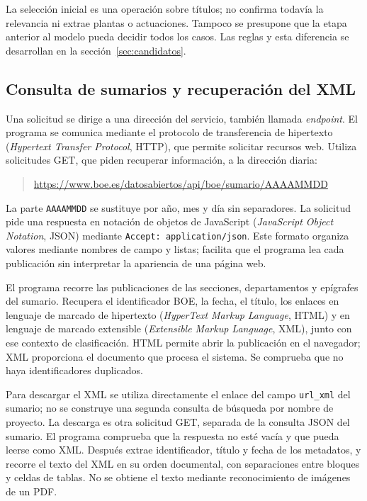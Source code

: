 La selección inicial es una operación sobre títulos; no confirma todavía la
relevancia ni extrae plantas o actuaciones. Tampoco se presupone que la etapa
anterior al modelo pueda decidir todos los casos. Las reglas y esta diferencia
se desarrollan en la sección~\ref{sec:candidatos}.

\subsection{Consulta de sumarios y recuperación del XML}
Una solicitud se dirige a una dirección del servicio, también llamada
\emph{endpoint}. El programa se comunica mediante el protocolo de transferencia
de hipertexto (\textit{Hypertext Transfer Protocol}, HTTP), que
permite solicitar recursos web. Utiliza solicitudes GET, que piden recuperar
información, a la dirección diaria:

\begin{quote}
\small
\url{https://www.boe.es/datosabiertos/api/boe/sumario/AAAAMMDD}
\end{quote}

La parte \texttt{AAAAMMDD} se sustituye por año, mes y día sin separadores.
La solicitud pide una respuesta en notación de objetos de JavaScript
(\textit{JavaScript Object Notation}, JSON) mediante
\texttt{Accept: application/json}. Este formato organiza
valores mediante nombres de campo y listas; facilita que el programa lea
cada publicación sin interpretar la apariencia de una página web.

El programa recorre las publicaciones de las secciones, departamentos y
epígrafes del sumario. Recupera el identificador BOE, la fecha, el título,
los enlaces en lenguaje de marcado de hipertexto
(\textit{HyperText Markup Language}, HTML) y en lenguaje de marcado extensible
(\textit{Extensible Markup Language}, XML), junto con ese contexto de
clasificación. HTML permite abrir la publicación en el navegador; XML
proporciona el documento que procesa
el sistema. Se comprueba que no haya identificadores duplicados.

Para descargar el XML se utiliza directamente el enlace del campo
\texttt{url\_xml} del sumario; no se construye una segunda consulta de búsqueda
por nombre de proyecto. La descarga es otra solicitud GET, separada de la
consulta JSON del sumario. El programa comprueba que la respuesta no esté
vacía y que pueda leerse como XML. Después extrae identificador, título y
fecha de los metadatos, y recorre el texto del XML en su orden documental,
con separaciones entre bloques y celdas de tablas. No se obtiene el texto
mediante reconocimiento de imágenes de un PDF.

